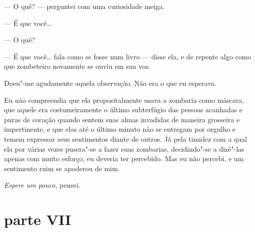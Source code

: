--- O quê? --- perguntei com uma curiosidade meiga.

--- É que você\ldots{}

--- O quê?

--- É que você\ldots{} fala como se fosse num livro --- disse ela, e de repente
algo como que zombeteiro novamente se ouviu em sua voz.

Doeu"-me agudamente aquela observação. Não era o que eu esperava.
 

Eu não compreendia que ela propositalmente usava a zombaria como
máscara, que aquele era costumeiramente o último subterfúgio das
pessoas acanhadas e puras de coração quando sentem suas almas invadidas
de maneira grosseira e impertinente, e que elas até o último minuto não
se entregam por orgulho e temem expressar seus sentimentos diante de
outros. Já pela timidez com a qual ela por várias vezes pusera"-se a
fazer suas zombarias, decidindo"-se a dizê"-las apenas com muito esforço,
eu deveria ter percebido. Mas eu não percebi, e um sentimento ruim se
apoderou de mim.

\textit{Espere um pouco}, pensei.


\section{parte VII}

